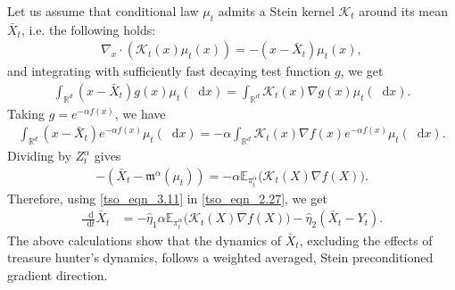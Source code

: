 \documentclass{article}
\def\m{\mathfrak{m}}
\newcommand*\der{\mathop{}\!\mathrm{d}}
\numberwithin{equation}{section}
\begin{document}
Let us assume that conditional law $\mu_t$ admits a Stein kernel $\mathcal{K}_t$ around its mean $\bar{X}_t$, i.e. the following holds:
\begin{align}
     \nabla_x\cdot( \mathcal{K}_t(x) \mu_t(x)) = -(x - \bar{X}_t)\mu_t(x),
\end{align}
and integrating with sufficiently fast decaying test function $g$, we get
\begin{align}
    \int_{\mathbb{R}^d}(x- \bar{X}_t) g(x) \mu_t(\der x) = \int_{\mathbb{R}^d}\mathcal{K}_t(x) \nabla g(x) \mu_t(\der x). 
\end{align}
Taking $g = e^{-\alpha f(x)}$, we have
\begin{align}
 \int_{\mathbb{R}^d}(x- \bar{X}_t) e^{-\alpha f(x)} \mu_t(\der x) = -\alpha \int_{\mathbb{R}^d} \mathcal{K}_t(x) \nabla f (x) e^{-\alpha f(x)} \mu_t(\der x). 
\end{align}
Dividing by $Z_t^\alpha$ gives
\begin{align}\label{tso_eqn_3.11}
    -( \bar{X}_t - \m^{\alpha}(\mu_t)) = -\alpha \mathbb{E}_{\pi_t^\alpha}\big( \mathcal{K}_t(X) \nabla f(X)  \big).
\end{align}
Therefore, using \eqref{tso_eqn_3.11}  in \eqref{tso_eqn_2.27}, we get 
\begin{align}\label{tso_eqn_3.12}
\frac{\der}{\der t} \bar{X}_t &= -\hat{\eta}_1\alpha \mathbb{E}_{\pi_t^\alpha}\big( \mathcal{K}_t(X) \nabla f(X)  \big) - \hat{\eta}_2 (\bar{X}_t - Y_t).
\end{align}
The above calculations show that the dynamics of $\bar{X}_t$,  excluding the effects of treasure hunter's dynamics, follows a weighted averaged, Stein preconditioned gradient direction.  
\end{document}
